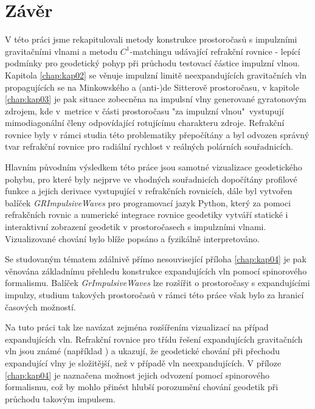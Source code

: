 \chapter*{Závěr}

V této práci jsme rekapitulovali metody konstrukce prostoročasů s impulzními gravitačními vlnami
a metodu $C^1$-matchingu udávající refrakční rovnice - lepící podmínky pro geodetický pohyp při průchodu
testovací částice impulzní vlnou. Kapitola \ref{chap:kap02} se věnuje impulzní limitě neexpandujících
gravitačních vln propagujících se na Minkowského a (anti-)de Sitterově prostoročasu, v kapitole \ref{chap:kap03}
je pak situace zobecněna na impulsní vlny generované gyratonovým zdrojem, kde v~metrice v části prostoročasu "za impulzní vlnou"\
vystupují mimodiagonální členy odpovídající rotujícímu charakteru zdroje.
Refrakční rovnice byly v rámci studia této problematiky přepočítány a byl odvozen správný tvar refrakční rovnice
pro radiální rychlost v reálných polárních souřadnicích.

Hlavním původním výsledkem této práce jsou samotné vizualizace geodetického pohybu, pro které byly nejprve ve vhodných souřadnicích dopočítány
profilové funkce a jejich derivace vystupující v refrakčních rovnicích, dále byl vytvořen balíček \textit{GRImpulsiveWaves} pro programovací jazyk
Python, který za pomoci refrakčních rovnic a numerické integrace rovnice geodetiky
vytváří statické i interaktivní zobrazení geodetik v prostoročasech s impulzními vlnami.
Vizualizované chování bylo blíže popsáno a fyzikálně interpretováno.

Se studovaným tématem zdálnivě přímo nesouvisející příloha \ref{chap:kap04} je pak věnována základnímu přehledu konstrukce expandujících vln pomocí spinorového formalismu.
Balíček \emph{GrImpulsiveWaves} lze rozšířit o prostoročasy s expandujícími impulzy, studium takových prostoročasů v rámci této práce však bylo
za hranicí časových možností.

Na tuto práci tak lze navázat zejména rozšířením vizualizací na případ expandujících vln. Refrakční rovnice pro
třídu řešení expandujících gravitačních vln jsou známé (například \cite{Podolsky:2016mqg}) a ukazují, že
geodetické chování při přechodu expandující vlny je složitější, než v případě vln neexpandujících. V příloze \ref{chap:kap04}
je naznačena možnost jejich odvození pomocí spinorového formalismu, což by mohlo přinést hlubší porozumění chování geodetik
při průchodu takovým impulsem.

\clearpage
